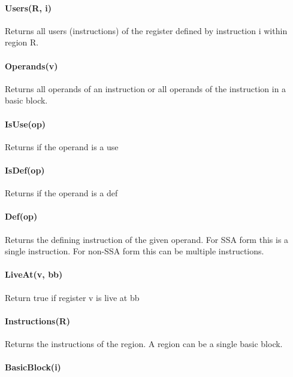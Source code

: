 \documentclass[12pt]{article}
\begin{document}
\paragraph{Users(R, i)}

Returns all users (instructions) of the register defined by instruction i within region R.

\paragraph{Operands(v)}

Returns all operands of an instruction or all operands of the instruction in a basic block.

\paragraph{IsUse(op)}

Returns if the operand is a use

\paragraph{IsDef(op)}

Returns if the operand is a def

\paragraph{Def(op)}

Returns the defining instruction of the given operand.
For SSA form this is a single instruction.
For non-SSA form this can be multiple instructions.

\paragraph{LiveAt(v, bb)}

Return true if register v is live at bb

\paragraph{Instructions(R)}

Returns the instructions of the region.
A region can be a single basic block.

\paragraph{BasicBlock(i)}
\end{document}
